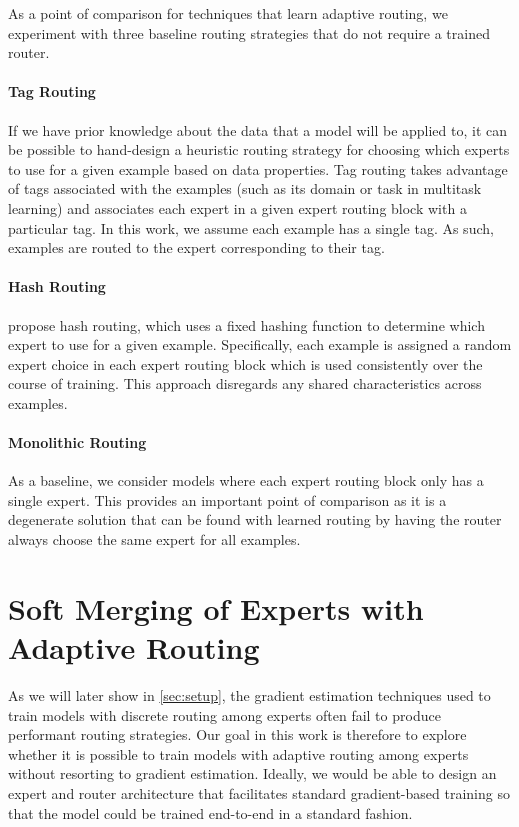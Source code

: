 \documentclass{article}
\theoremstyle{plain}
\theoremstyle{definition}
\theoremstyle{remark}
\begin{document}
As a point of comparison for techniques that learn adaptive routing, we experiment with three baseline routing strategies that do not require a trained router.

\paragraph{Tag Routing}
If we have prior knowledge about the data that a model will be applied to, it can be possible to hand-design a heuristic routing strategy for choosing which experts to use for a given example based on data properties.
Tag routing takes advantage of tags associated with the examples (such as its domain or task in multitask learning) and associates each expert in a given expert routing block with a particular tag.
In this work, we assume each example has a single tag.
As such, examples are routed to the expert corresponding to their tag.

\paragraph{Hash Routing}
\citet{roller2021hash} propose hash routing, which uses a fixed hashing function to determine which expert to use for a given example.
Specifically, each example is assigned a random expert choice in each expert routing block which is used consistently over the course of training.
This approach disregards any shared characteristics across examples.

\paragraph{Monolithic Routing}
As a baseline, we consider models where each expert routing block only has a single expert.
This provides an important point of comparison as it is a degenerate solution that can be found with learned routing by having the router always choose the same expert for all examples.

\section{Soft Merging of Experts with Adaptive Routing}
\label{sec:smear}
As we will later show in \cref{sec:setup}, the gradient estimation techniques used to train models with discrete routing among experts often fail to produce performant routing strategies.
Our goal in this work is therefore to explore whether it is possible to train models with adaptive routing among experts without resorting to gradient estimation.
Ideally, we would be able to design an expert and router architecture that facilitates standard gradient-based training so that the model could be trained end-to-end in a standard fashion.
\end{document}
